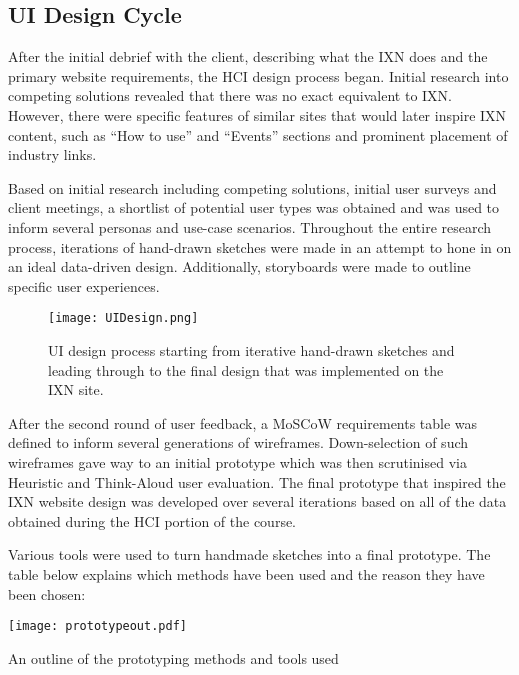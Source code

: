 \documentclass[fontsize=11pt]{extarticle}
\numberwithin{figure}{section} %
\numberwithin{table}{section}%
\begin{document}
\hypertarget{ui-design-cycle}{%
\subsection{UI Design Cycle}\label{ui-design-cycle}}

After the initial debrief with the client, describing what the IXN does
and the primary website requirements, the HCI design process began.
Initial research into competing solutions revealed that there was no
exact equivalent to IXN. However, there were specific features of
similar sites that would later inspire IXN content, such as ``How to
use'' and ``Events'' sections and prominent placement of industry links.

Based on initial research including competing solutions, initial user
surveys and client meetings, a shortlist of potential user types was
obtained and was used to inform several personas and use-case scenarios.
Throughout the entire research process, iterations of hand-drawn
sketches were made in an attempt to hone in on an ideal data-driven
design. Additionally, storyboards were made to outline specific user
experiences.

\begin{figure}[H]
\centering
\texttt{[image: UIDesign.png]}
\caption{UI design process starting from iterative hand-drawn sketches and leading through to the final design that was implemented on the IXN site.}
\label{UIDesign}
\end{figure}

After the second round of user feedback, a MoSCoW requirements table was
defined to inform several generations of wireframes. Down-selection of
such wireframes gave way to an initial prototype which was then
scrutinised via Heuristic and Think-Aloud user evaluation. The final
prototype that inspired the IXN website design was developed over
several iterations based on all of the data obtained during the HCI
portion of the course.

Various tools were used to turn handmade sketches into a final
prototype. The table below explains which methods have been used and the
reason they have been chosen:

\begin{table}[H]
      \centering
      \texttt{[image: prototypeout.pdf]}
      \caption{An outline of the prototyping methods and tools used}
 \end{table}
\end{document}
